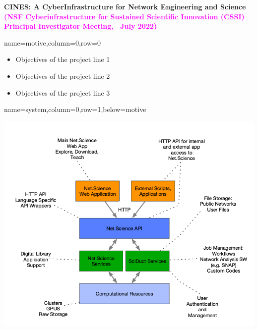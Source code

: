 \documentclass[landscape,a0paper,fontscale=0.285]{baposter} %
\begin{document}
\begin{poster}
{\begin{tabular}{c c}
\end{tabular}
}
{\textbf{CINES: A CyberInfrastructure for Network Engineering and Science}
} %
{
            \textcolor{magenta}{%
               \textbf{(NSF Cyberinfrastructure for Sustained Scientific Innovation (CSSI) Principal Investigator Meeting,~ July 2022)}}
            } %

\vspace{-2.5in} %


          {name=motive,column=0,row=0}{
{\small
\begin{itemize}[leftmargin=*,noitemsep,topsep=0pt]
\item Objectives of the project line 1
\item Objectives of the project line 2
\item Objectives of the project line 3
\end{itemize}
}}

          {name=system,column=0,row=1,below=motive}{
\includegraphics[scale=0.5]{figures/sys_descr.png}

}
\end{poster}
\end{document}
